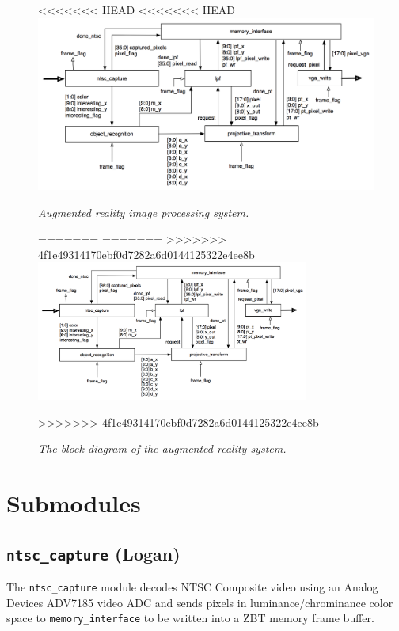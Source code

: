 \documentclass[10pt]{article}
\begin{document}
\begin{figure}[h!]
\centering
<<<<<<< HEAD
<<<<<<< HEAD
\includegraphics[width=\textwidth]{block_diagram_with_wires.png}
\caption{\emph{Augmented reality image processing system.}}
=======
=======
>>>>>>> 4f1e49314170ebf0d7282a6d0144125322e4ee8b
\includegraphics[width=0.8\textwidth]{block_diagram_with_wires.png}
\caption{\emph{The block diagram of the augmented reality system.}}
>>>>>>> 4f1e49314170ebf0d7282a6d0144125322e4ee8b
\end{figure}
\section{Submodules}
\subsection{{\tt ntsc\_capture} (Logan)}
The {\tt ntsc\_capture} module decodes NTSC Composite video using an Analog Devices ADV7185 video ADC and sends pixels in luminance/chrominance color space to {\tt memory\_interface} to be written into a ZBT memory frame buffer.
\end{document}

